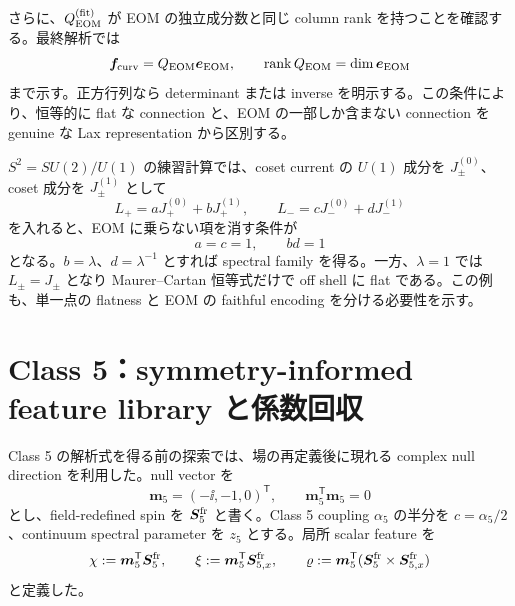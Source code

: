 さらに、$Q_{\rm EOM}^{(\mathrm{fit})}$ が EOM の独立成分数と同じ column rank を持つことを確認する。最終解析では
\begin{equation}
\boldsymbol f_{\rm curv}=Q_{\rm EOM}\boldsymbol e_{\rm EOM},
\qquad
\operatorname{rank}Q_{\rm EOM}=\dim\boldsymbol e_{\rm EOM}
\label{eq:ml-rank-certificate}
\end{equation}
まで示す。正方行列なら determinant または inverse を明示する。この条件により、恒等的に flat な connection と、EOM の一部しか含まない connection を genuine な Lax representation から区別する。

$S^2=SU(2)/U(1)$ の練習計算では、coset current の $U(1)$ 成分を $J_\pm^{(0)}$、coset 成分を $J_\pm^{(1)}$ として
\begin{equation}
L_+=aJ_+^{(0)}+bJ_+^{(1)},
\qquad
L_-=cJ_-^{(0)}+dJ_-^{(1)}
\end{equation}
を入れると、EOM に乗らない項を消す条件が
\begin{equation}
a=c=1,
\qquad
bd=1
\end{equation}
となる。$b=\lambda$、$d=\lambda^{-1}$ とすれば spectral family を得る。一方、$\lambda=1$ では $L_\pm=J_\pm$ となり Maurer--Cartan 恒等式だけで off shell に flat である。この例も、単一点の flatness と EOM の faithful encoding を分ける必要性を示す。

\section{Class 5：symmetry-informed feature library と係数回収}
\label{sec:ml-class5}
Class 5 の解析式を得る前の探索では、場の再定義後に現れる complex null direction を利用した。null vector を
\begin{equation}
\boldsymbol m_5=(-\ii,-1,0)^{\mathsf T},
\qquad
\boldsymbol m_5^{\mathsf T}\boldsymbol m_5=0
\end{equation}
とし、field-redefined spin を $\boldsymbol S_5^{\rm fr}$ と書く。Class 5 coupling $\alpha_5$ の半分を $c=\alpha_5/2$、continuum spectral parameter を $z_5$ とする。局所 scalar feature を
\begin{equation}
\chi:=\boldsymbol m_5^{\mathsf T}\boldsymbol S_5^{\rm fr},
\qquad
\xi:=\boldsymbol m_5^{\mathsf T}\boldsymbol S_{5,x}^{\rm fr},
\qquad
\varrho:=\boldsymbol m_5^{\mathsf T}
(\boldsymbol S_5^{\rm fr}\times\boldsymbol S_{5,x}^{\rm fr})
\label{eq:ml5-scalars}
\end{equation}
と定義した。

